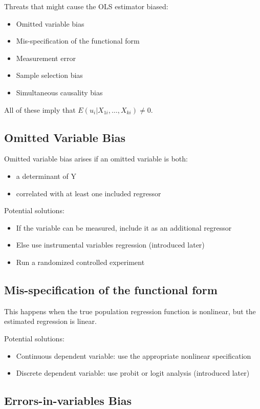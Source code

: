 \documentclass{article}
\begin{document}
Threats that might cause the OLS estimator biased:
\begin{itemize}
	\item Omitted variable bias
	\item Mis-specification of the functional form
	\item Measurement error
	\item Sample selection bias
	\item Simultaneous causality bias
\end{itemize}

All of these imply that $E(u_i | X_{1i}, \ldots, X_{ki}) \neq 0$.

\subsection{Omitted Variable Bias}

Omitted variable bias arises if an omitted variable is both:
\begin{itemize}
	\item a determinant of Y
	\item correlated with at least one included regressor
\end{itemize}

Potential solutions:
\begin{itemize}
	\item If the variable can be measured, include it as an additional regressor
	\item Else use instrumental variables regression (introduced later)
	\item Run a randomized controlled experiment
\end{itemize}

\subsection{Mis-specification of the functional form}

This happens when the true population regression function is nonlinear,
but the estimated regression is linear.

Potential solutions:
\begin{itemize}
	\item Continuous dependent variable: use the appropriate nonlinear specification
	\item Discrete dependent variable: use probit or logit analysis (introduced later)
\end{itemize}

\subsection{Errors-in-variables Bias}
\end{document}
